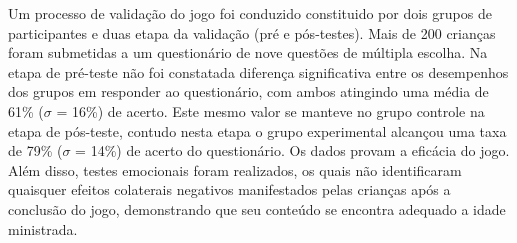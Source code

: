






Um processo de validação do jogo foi conduzido constituido por dois grupos de participantes e duas etapa da validação (pré e pós-testes).
Mais de 200 crianças foram submetidas a um questionário de nove questões de múltipla escolha. %
Na etapa de pré-teste não foi constatada diferença significativa entre os desempenhos dos grupos em responder ao questionário, com ambos atingindo uma média de 61\% ($\sigma$ = 16\%) de acerto. Este mesmo valor se manteve no grupo controle na etapa de pós-teste, contudo nesta etapa o grupo experimental alcançou uma taxa de 79\%  ($\sigma$ = 14\%) de acerto do questionário. Os dados provam a eficácia do jogo. Além disso, testes emocionais foram realizados, os quais não identificaram quaisquer efeitos colaterais negativos manifestados pelas crianças após a conclusão do jogo, demonstrando que seu conteúdo se encontra adequado a idade ministrada. 

